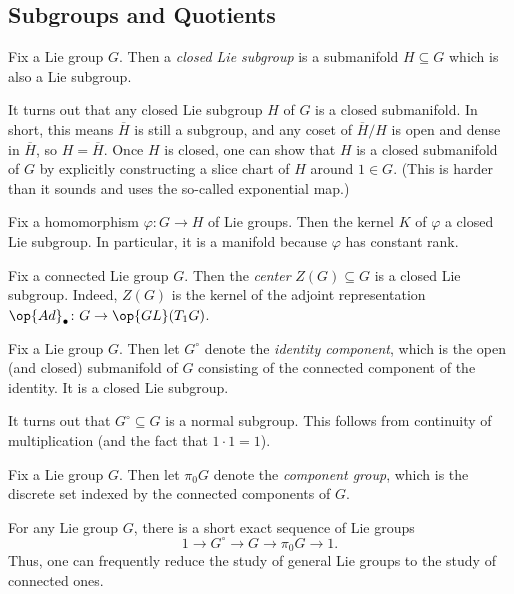 \documentclass{article}
\begin{document}
\subsection{Subgroups and Quotients} \label{subsec:sub-quot}
\begin{definition}
	Fix a Lie group $G$. Then a \textit{closed Lie subgroup} is a submanifold $H\subseteq G$ which is also a Lie subgroup.
\end{definition}
\begin{remark}
	It turns out that any closed Lie subgroup $H$ of $G$ is a closed submanifold. In short, this means $\overline H$ is still a subgroup, and any coset of $\overline H/H$ is open and dense in $\overline H$, so $H=\overline H$. Once $H$ is closed, one can show that $H$ is a closed submanifold of $G$ by explicitly constructing a slice chart of $H$ around $1\in G$. (This is harder than it sounds and uses the so-called exponential map.)
\end{remark}
\begin{example}[kernel]
	Fix a homomorphism $\varphi\colon G\to H$ of Lie groups. Then the kernel $K$ of $\varphi$ a closed Lie subgroup. In particular, it is a manifold because $\varphi$ has constant rank.
\end{example}
\begin{example}[center]
	Fix a connected Lie group $G$. Then the \textit{center} $Z(G)\subseteq G$ is a closed Lie subgroup. Indeed, $Z(G)$ is the kernel of the adjoint representation $\op{Ad}_\bullet\colon G\to\op{GL}(T_1G)$.
\end{example}
\begin{example}
	Fix a Lie group $G$. Then let $G^\circ$ denote the \textit{identity component}, which is the open (and closed) submanifold of $G$ consisting of the connected component of the identity. It is a closed Lie subgroup.
\end{example}
\begin{remark}
	It turns out that $G^\circ\subseteq G$ is a normal subgroup. This follows from continuity of multiplication (and the fact that $1\cdot1=1$).
\end{remark}
\begin{definition}
	Fix a Lie group $G$. Then let $\pi_0G$ denote the \textit{component group}, which is the discrete set indexed by the connected components of $G$.
\end{definition}
\begin{remark}
	For any Lie group $G$, there is a short exact sequence of Lie groups
	\[1\to G^\circ\to G\to\pi_0G\to1.\]
	Thus, one can frequently reduce the study of general Lie groups to the study of connected ones.
\end{remark}
\end{document}
